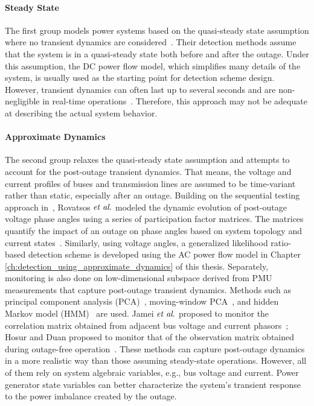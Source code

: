 \paragraph{Steady State}
The first group models power systems based on the quasi-steady state assumption where no transient dynamics are considered~\cite{Tate2008, tate2009double, babakmehr2015application,Chen2016, ardakanian2017event,Ardakanian2019a}. Their detection methods assume that the system is in a quasi-steady state both before and after the outage. Under this assumption, the DC power flow model, which simplifies many details of the system, is usually used as the starting point for detection scheme design. However, transient dynamics can often last up to several seconds and are non-negligible in real-time operations~\cite{Glover2012}. Therefore, this approach may not be adequate at describing the actual system behavior. 

\paragraph{Approximate Dynamics}
The second group relaxes the quasi-steady state assumption and attempts to account for the post-outage transient dynamics. That means, the voltage and current profiles of buses and transmission lines are assumed to be time-variant rather than static, especially after an outage.
Building on the sequential testing approach in~\cite{Chen2016}, Rovatsos $\textit{et al}.$ modeled the dynamic evolution of post-outage voltage phase angles using a series of participation factor matrices. The matrices quantify the impact of an outage on phase angles based on system topology and current states~\cite{Rovatsos2017}. 
Similarly, using voltage angles, a generalized likelihood ratio-based detection scheme is developed using the AC power flow model in Chapter \ref{ch:detection_using_approximate_dynamics} of this thesis. 
Separately, monitoring is also done on low-dimensional subspace derived from PMU measurements that capture post-outage transient dynamics. Methods such as principal component analysis (PCA)~\cite{Xie2014}, moving-window PCA~\cite{Rafferty2016}, and hidden Markov model (HMM)~\cite{Huang2016b} are used. Jamei $\textit{et al}.$ proposed to monitor the correlation matrix obtained from adjacent bus voltage and current phasors~\cite{Jamei2017a}; Hosur and Duan proposed to monitor that of the observation matrix obtained during outage-free operation~\cite{Hosur2019}. These methods can capture post-outage dynamics in a more realistic way than those assuming steady-state operations. However, all of them rely on system algebraic variables, e.g., bus voltage and current. Power generator state variables can better characterize the system's transient response to the power imbalance created by the outage.


